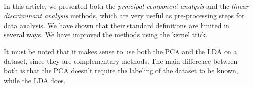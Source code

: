 \paragraph{}
In this article, we presented both the \emph{principal component analysis} and the \emph{linear
discriminant analysis} methods, which are very useful as pre-processing steps for data analysis. We
have shown that their standard definitions are limited in several ways. We have improved the
methods using the kernel trick.

It must be noted that it makes sense to use both the PCA and the LDA on a dataset, since they are
complementary methods. The main difference between both is that the PCA doesn't require the labeling
of the dataset to be known, while the LDA does.
